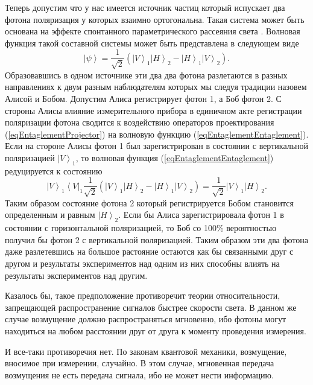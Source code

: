 Теперь допустим что у нас имеется источник частиц который испускает два фотона поляризация 
у которых взаимно ортогональна. Такая система может быть основана на эффекте спонтанного 
параметрического рассеяния света \cite{bKlishko}. Волновая функция такой составной системы 
может быть представлена в следующем виде
\begin{equation}
\left|\psi\right> = \frac{1}{\sqrt{2}}\left(
\left|V\right>_1\left|H\right>_2 - \left|H\right>_1\left|V\right>_2
\right).
\label{eqEntaglementEntaglement}
\end{equation}
Образовавшись в одном источнике эти два два фотона разлетаются в разных направлениях к двум разным
наблюдателям которых мы следуя традиции назовем Алисой и Бобом. Допустим Алиса регистрирует фотон 1, а 
Боб фотон 2. С стороны Алисы влияние измерительного прибора в единичном акте регистрации поляризации
фотона сводится к воздействию операторов проектирования (\ref{eqEntaglementProjector}) на 
волновую функцию (\ref{eqEntaglementEntaglement}). Если на стороне Алисы фотон 1 был зарегистрирован в
состоянии с вертикальной поляризацией $\left|V\right>_1$, то волновая функция (\ref{eqEntaglementEntaglement})
редуцируется к состоянию
\begin{equation}
\left|V\right>_1\left<V\right|_1 
\frac{1}{\sqrt{2}} \left(
\left|V\right>_1\left|H\right>_2 - \left|H\right>_1\left|V\right>_2
\right) = \frac{1}{\sqrt{2}}
\left|V\right>_1\left|H\right>_2.
\nonumber
\end{equation}
Таким образом состояние фотона 2 который регистрируется Бобом становится определенным и равным $\left|H\right>_2$.
Если бы Алиса зарегистрировала фотон 1 в состоянии с горизонтальной поляризацией, то Боб со 100\% вероятностью 
получил бы фотон 2 с вертикальной поляризацией. Таким образом эти два фотона даже разлетевшись на большое 
растояние остаются как бы связанными друг с другом и результаты экспериментов
над одним из них способны влиять на результаты экспериментов над другим. 

Казалось бы, такое предположение противоречит теории относительности, запрещающей распространение сигналов быстрее скорости света. 
В данном же случае возмущение должно распространяться мгновенно, ибо фотоны могут находиться на любом расстоянии друг 
от друга к моменту проведения измерения.

И все-таки противоречия нет. По законам квантовой механики, возмущение, вносимое при измерении, случайно. В этом случае, мгновенная передача возмущения не есть передача сигнала, ибо не может нести информацию.

